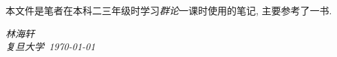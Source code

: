     本文件是笔者在本科二三年级时学习\emph{群论}一课时使用的笔记, 主要参考了一书.

    \vspace{2cm}
    \begin{flushright}
        \textit{林海轩} \\[1em]
        \textit{复旦大学\ \today}
    \end{flushright}